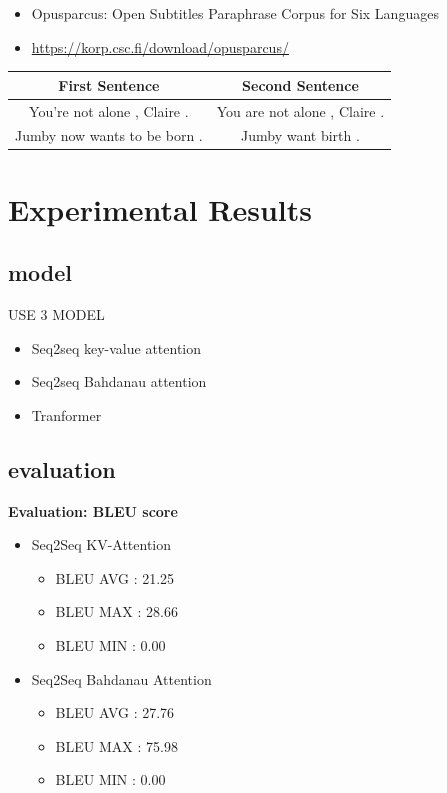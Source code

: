 \documentclass{article}
\begin{document}
\begin{itemize}
\item Opusparcus: Open Subtitles Paraphrase Corpus for Six Languages 
\item \url{https://korp.csc.fi/download/opusparcus/}
\end{itemize}
\begin{center}
 \begin{tabular}{||c c ||} 
 \hline
First Sentence & Second Sentence \\ [0.5ex] 
 \hline\hline
 You're not alone , Claire . & You are not alone , Claire . \\ 
 \hline
 Jumby now wants to be born . & Jumby want birth .  \\ [1ex] 
 \hline
\end{tabular}
\end{center}


\section{Experimental Results} \label{sec:exp}
\subsection{model}
USE 3 MODEL
\begin{itemize}
\item Seq2seq key-value attention
\item Seq2seq Bahdanau attention
\item Tranformer
\end{itemize}


\subsection{evaluation}
{\bf Evaluation: BLEU score}


\begin{itemize}
\item Seq2Seq KV-Attention
\begin{itemize}
\item BLEU AVG : 21.25
\item BLEU MAX : 28.66
\item BLEU MIN : 0.00
\end{itemize}
\end{itemize}

\begin{itemize}
\item Seq2Seq Bahdanau Attention
\begin{itemize}
\item BLEU AVG : 27.76
\item BLEU MAX : 75.98
\item BLEU MIN : 0.00
\end{itemize}
\end{itemize}
\end{document}
